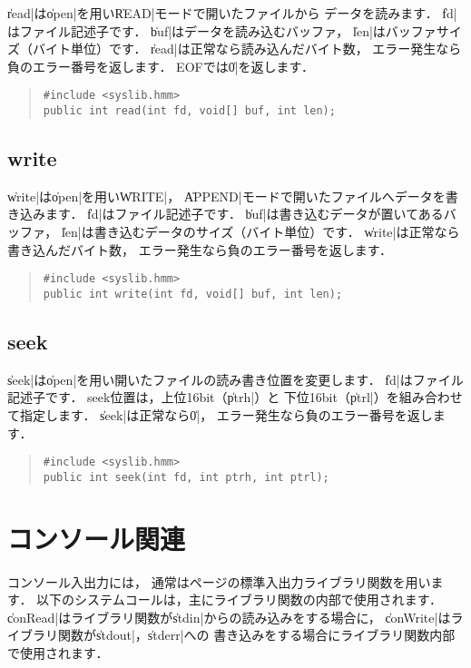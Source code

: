 \|read|は\|open|を用い\|READ|モードで開いたファイルから
データを読みます．
\|fd|はファイル記述子です．
\|buf|はデータを読み込むバッファ，
\|len|はバッファサイズ（バイト単位）です．
\|read|は正常なら読み込んだバイト数，
エラー発生なら負のエラー番号を返します．
EOFでは\|0|を返します．

\begin{quote}
\begin{verbatim}
#include <syslib.hmm>
public int read(int fd, void[] buf, int len);
\end{verbatim}
\end{quote}

\subsection{write}

\|write|は\|open|を用い\|WRITE|，
\|APPEND|モードで開いたファイルへデータを書き込みます．
\|fd|はファイル記述子です．
\|buf|は書き込むデータが置いてあるバッファ，
\|len|は書き込むデータのサイズ（バイト単位）です．
\|write|は正常なら書き込んだバイト数，
エラー発生なら負のエラー番号を返します．

\begin{quote}
\begin{verbatim}
#include <syslib.hmm>
public int write(int fd, void[] buf, int len);
\end{verbatim}
\end{quote}

\subsection{seek}

\|seek|は\|open|を用い開いたファイルの読み書き位置を変更します．
\|fd|はファイル記述子です．
seek位置は，上位16bit（\|ptrh|）と
下位16bit（\|ptrl|）を組み合わせて指定します．
\|seek|は正常なら\|0|，
エラー発生なら負のエラー番号を返します．

\begin{quote}
\begin{verbatim}
#include <syslib.hmm>
public int seek(int fd, int ptrh, int ptrl);
\end{verbatim}
\end{quote}

\section{コンソール関連}

コンソール入出力には，
通常は\pageref{chap4:stdio}ページの標準入出力ライブラリ関数を用います．
以下のシステムコールは，主にライブラリ関数の内部で使用されます．
\|conRead|はライブラリ関数が\|stdin|からの読み込みをする場合に，
\|conWrite|はライブラリ関数が\|stdout|，\|stderr|への
書き込みをする場合にライブラリ関数内部で使用されます．

